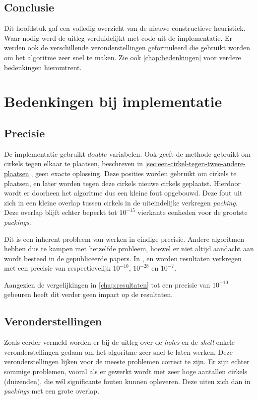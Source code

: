 \documentclass[12pt,a4paper,oneside]{book}
\begin{document}
\section{Conclusie}

Dit hoofdstuk gaf een volledig overzicht van de nieuwe constructieve heuristiek.
Waar nodig werd de uitleg verduidelijkt met code uit de implementatie.
Er werden ook de verschillende veronderstellingen geformuleerd die gebruikt worden om het algoritme zeer snel te maken.
Zie ook \autoref{chap:bedenkingen} voor verdere bedenkingen hieromtrent.


\chapter{Bedenkingen bij implementatie} \label{chap:bedenkingen}

\section{Precisie}

De implementatie gebruikt $double$ variabelen.
Ook geeft de methode gebruikt om cirkels tegen elkaar te plaatsen, beschreven in \autoref{sec:een-cirkel-tegen-twee-andere-plaatsen}, geen exacte oplossing.
Deze posities worden gebruikt om cirkels te plaatsen, en later worden tegen deze cirkels nieuwe cirkels geplaatst.
Hierdoor wordt er doorheen het algoritme dus een kleine fout opgebouwd.
Deze fout uit zich in een kleine overlap tussen cirkels in de uiteindelijke verkregen \textit{packing}.
Deze overlap blijft echter beperkt tot $10^{-15}$ vierkante eenheden voor de grootste \textit{packings}.

Dit is een inherent probleem van werken in eindige precisie.
Andere algoritmen hebben dus te kampen met hetzelfde probleem, hoewel er niet altijd aandacht aan wordt besteed in de gepubliceerde papers.
In \cite{akeb2006basic}, \cite{ye2013iterated} en \cite{m2013packing} worden resultaten verkregen met een precisie van respectievelijk $10^{-10}$, $10^{-28}$ en $10^{-7}$.

Aangezien de vergelijkingen in \autoref{chap:resultaten} tot een precisie van $10^{-10}$ gebeuren heeft dit verder geen impact op de resultaten.

\section{Veronderstellingen}

Zoals eerder vermeld worden er bij de uitleg over de \textit{holes} en de \textit{shell} enkele veronderstellingen gedaan om het algoritme zeer snel te laten werken.
Deze veronderstellingen lijken voor de meeste problemen correct te zijn.
Er zijn echter sommige problemen, vooral als er gewerkt wordt met zeer hoge aantallen cirkels (duizenden), die wél significante fouten kunnen opleveren.
Deze uiten zich dan in \textit{packings} met een grote overlap.
\end{document}
